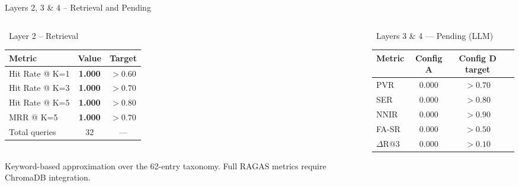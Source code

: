 \documentclass[aspectratio=169, 10pt]{beamer}
\begin{document}
\begin{frame}{Layers 2, 3 \& 4 -- Retrieval and Pending}
  \begin{columns}[T]
    \begin{column}{0.46\textwidth}
      \begin{exampleblock}{\faProjectDiagram\ Layer 2 -- Retrieval}
        {\scriptsize
        \begin{tabular}{@{}lcc@{}}
          \toprule
          Metric & Value & Target\\
          \midrule
          Hit Rate @ K=1 & \textbf{1.000} & $>0.60$\\
          Hit Rate @ K=3 & \textbf{1.000} & $>0.70$\\
          Hit Rate @ K=5 & \textbf{1.000} & $>0.80$\\
          MRR @ K=5 & \textbf{1.000} & $>0.70$\\
          Total queries & 32 & ---\\
          \bottomrule
        \end{tabular}}\\[0.3em]
        {\tiny Keyword-based approximation over the 62-entry taxonomy.
        Full RAGAS metrics require ChromaDB integration.}
      \end{exampleblock}
    \end{column}
    \begin{column}{0.50\textwidth}
      \begin{alertblock}{\faHourglassHalf\ Layers 3 \& 4 --- Pending (LLM)}
        {\scriptsize
        \begin{tabular}{@{}lccc@{}}
          \toprule
          Metric & Config A & Config D target\\
          \midrule
          PVR & 0.000 & $>0.70$\\
          SER & 0.000 & $>0.80$\\
          NNIR & 0.000 & $>0.90$\\
          FA-SR & 0.000 & $>0.50$\\
          $\Delta$R@3 & 0.000 & $>0.10$\\
          \bottomrule
        \end{tabular}}
      \end{alertblock}
      \vspace{0.3em}
    \end{column}
  \end{columns}
\end{frame}
\end{document}
